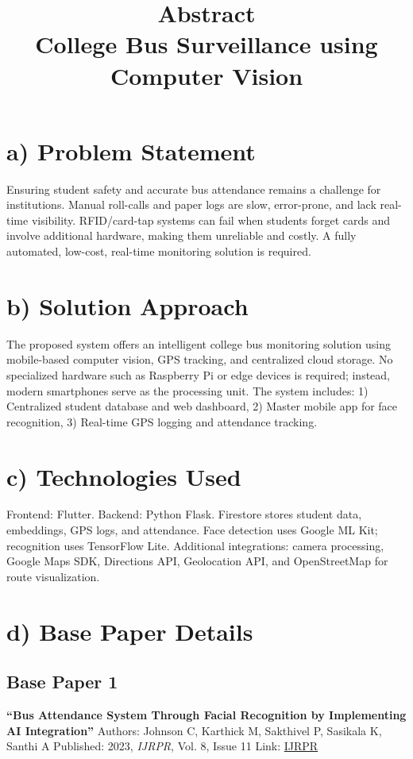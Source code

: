 \documentclass[11pt,a4paper]{article}
\title{\textbf{Abstract} \\ \large \textbf{College Bus Surveillance using Computer Vision}}
\author{}
\date{}
\begin{document}
\maketitle
\vspace{-3.5cm}
\section*{a) Problem Statement}
Ensuring student safety and accurate bus attendance remains a challenge for institutions. Manual roll-calls and paper logs are slow, error-prone, and lack real-time visibility. RFID/card-tap systems can fail when students forget cards and involve additional hardware, making them unreliable and costly. A fully automated, low-cost, real-time monitoring solution is required.

\section*{b) Solution Approach}
The proposed system offers an intelligent college bus monitoring solution using mobile-based computer vision, GPS tracking, and centralized cloud storage. No specialized hardware such as Raspberry Pi or edge devices is required; instead, modern smartphones serve as the processing unit. The system includes:  
1) Centralized student database and web dashboard,  
2) Master mobile app for face recognition,  
3) Real-time GPS logging and attendance tracking.

\section*{c) Technologies Used}
Frontend: Flutter. Backend: Python Flask.  
Firestore stores student data, embeddings, GPS logs, and attendance.  
Face detection uses Google ML Kit; recognition uses TensorFlow Lite.  
Additional integrations: camera processing, Google Maps SDK, Directions API, Geolocation API, and OpenStreetMap for route visualization.

\section*{d) Base Paper Details}

\subsection*{Base Paper 1}
\textbf{“Bus Attendance System Through Facial Recognition by Implementing AI Integration”}  
Authors: Johnson C, Karthick M, Sakthivel P, Sasikala K, Santhi A  
Published: 2023, \textit{IJRPR}, Vol. 8, Issue 11  
Link: \href{https://www.ijnrd.org/papers/IJNRD2311385.pdf}{IJRPR}
\end{document}
